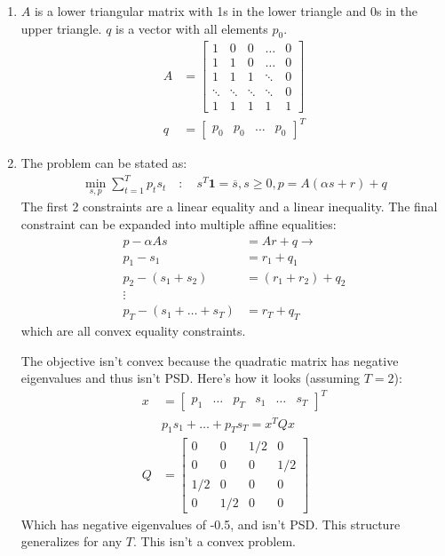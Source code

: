 \documentclass[11pt]{article}
\begin{document}
\begin{solution}
\begin{enumerate}
    \item $A$ is a lower triangular matrix with 1s in the lower triangle and 0s in the upper triangle. $q$ is a vector with all elements $p_0$.
        \begin{align*}
            A &= \begin{bmatrix}
                1 & 0 & 0 & \dots & 0 \\
                1 & 1 & 0 & \dots & 0 \\
                1 & 1 & 1 & \ddots & 0 \\
                \ddots & \ddots & \ddots & \ddots & 0 \\
                1 & 1 & 1 & 1 & 1
            \end{bmatrix} \\
            q &= \begin{bmatrix} p_0 & p_0 & \dots & p_0 \end{bmatrix}^T
        \end{align*}
    \item The problem can be stated as:
    \begin{align*}
        \min_{s,p} \sum_{t=1}^T p_t s_t \quad : \quad s^T \mathbf{1} = \overline{s}, s \geq 0, p = A(\alpha s + r) + q
    \end{align*}
    The first 2 constraints are a linear equality and a linear inequality. The final constraint can be expanded into multiple affine equalities:
    \begin{align*}
        p - \alpha A s &= A r + q \rightarrow \\
        p_1 - s_1 &= r_1 + q_1 \\
        p_2 - (s_1 + s_2) &= (r_1 + r_2) + q_2 \\
        \vdots \\
        p_T - (s_1 + \dots + s_T) &= r_T + q_T
    \end{align*}
    which are all convex equality constraints.

    The objective isn't convex because the quadratic matrix has negative eigenvalues and thus isn't PSD. Here's how it looks (assuming $T = 2$):
    \begin{align*}
        x &= \begin{bmatrix} p_1 & \dots & p_T & s_1 & \dots & s_T \end{bmatrix}^T \\
        &p_1 s_1 + \dots + p_T s_T = x^T Q x \\
        Q &= \begin{bmatrix}
            0 & 0 & 1/2 & 0 \\
            0 & 0 & 0 & 1/2 \\
            1/2 & 0 & 0 & 0 \\
            0 & 1/2 & 0 & 0
            \end{bmatrix}
    \end{align*}
    Which has negative eigenvalues of -0.5, and isn't PSD. This structure generalizes for any $T$. This isn't a convex problem.


\end{enumerate}
\end{solution}
\end{document}
